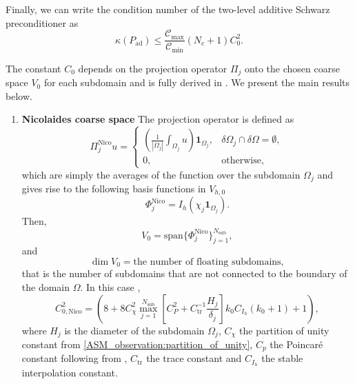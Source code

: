 Finally, we can write the condition number of the two-level additive Schwarz preconditioner as
\begin{equation}
  \kappa(P_{\text{ad}}) \leq \frac{\mathcal{C}_{\text{max}}}{\mathcal{C}_{\text{min}}} \left( N_c + 1 \right) C_0^2.
  \label{eq:two_level_ASM_condition_number}
\end{equation}

The constant $C_0$ depends on the projection operator $\Pi_j$ onto the chosen coarse space $V_0$ for each subdomain and is fully derived in \cite[Sections 5.5-5.7]{schwarz_methods_Dolean_2015}. We present the main results below.
\begin{enumerate}[label=\Roman*., ref=\textbf{ASM type \Roman* coarse space}]
  \item\label{ASM_coarse_space:nicolaides} \textbf{Nicolaides coarse space} The projection operator is defined as
  \begin{equation}
    \Pi_j^{\text{Nico}}u = \begin{cases}
      \left(\frac{1}{|\Omega_j|}\int_{\Omega_j} u\right)\mathbf{1}_{\Omega_j}, & \delta\Omega_j \cap \delta \Omega = \emptyset, \\
      0,                                                            & \text{otherwise},
    \end{cases}
    \label{eq:nicolaides_coarse_space_projection}
  \end{equation}
  which are simply the averages of the function over the subdomain $\Omega_j$ and gives rise to the following basis functions in $V_{h,0}$
  \[
    \Phi^{\text{Nico}}_j = I_h(\chi_j \mathbf{1}_{\Omega_j}).
  \]
  Then,
  \[
    V_0 = \text{span}\{\Phi^{\text{Nico}}_j\}_{j=1}^{N_{\text{sub}}},
  \]
  and
  \[
    \dim V_0 = \text{the number of floating subdomains},
  \]
  that is the number of subdomains that are not connected to the boundary of the domain $\Omega$. In this case \cite[Theorem 5.16]{schwarz_methods_Dolean_2015},
  \begin{equation}
    C_{0,\text{Nico}}^{2} = \left(8 + 8 C_{\chi}^2 \max_{j=1}^{N_{\text{sub}}}\left[C_P^2 + C^{-1}_{\text{tr}}\frac{H_j}{\delta_j}\right]k_0 C_{I_h}(k_0 + 1) + 1\right),
    \label{eq:c0_nicolaides}
  \end{equation}
  where $H_j$ is the diameter of the subdomain $\Omega_j$, $C_{\chi}$ the partition of unity constant from \cref{ASM_observation:partition_of_unity}, $C_p$ the Poincaré constant following from \cite[Lemma 5.18]{schwarz_methods_Dolean_2015}, $C_{\text{tr}}$ the trace constant and $C_{I_h}$ the stable interpolation constant.

\end{enumerate}
